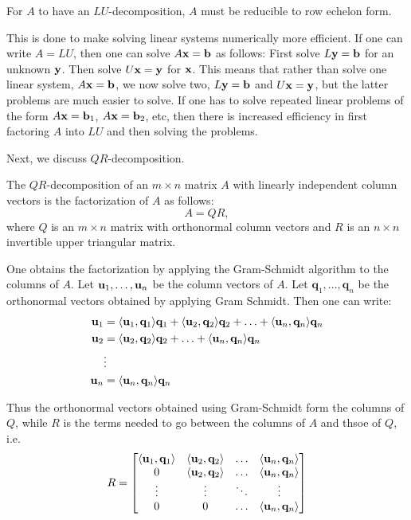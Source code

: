 \documentclass{article}
\begin{document}
For $A$ to have an $LU$-decomposition, $A$ must be reducible to row echelon form.

This is done to make solving linear systems numerically more efficient. If one can write $A = LU$, then one can solve $A {\mathbf{x}} = \mathbf{b}$ as follows:
First solve $L {\mathbf{y}} = \mathbf{b}$ for an unknown ${\mathbf{y}}$. Then solve $U {\mathbf{x}} = {\mathbf{y}}$ for ${\mathbf{x}}$. This means that rather than solve one linear system, $A {\mathbf{x}} = \mathbf{b}$, we now solve two, $L {\mathbf{y}} = \mathbf{b}$ and $U {\mathbf{x}} = {\mathbf{y}}$, but the latter problems are much easier to solve. If one has to solve repeated linear problems of the form $A{\mathbf{x}}=\mathbf{b}_1$, $A{\mathbf{x}}=\mathbf{b}_2$, etc, then there is increased efficiency in first factoring $A$ into $LU$ and then solving the problems.  

Next, we discuss $QR$-decomposition.

\begin{definition}[$QR$-decomposition]
The $QR$-decomposition of an $m \times n$ matrix $A$ with linearly independent column vectors is the factorization of $A$ as follows:
\begin{equation*}
    A = QR,
\end{equation*}
where $Q$ is an $m \times n$ matrix with orthonormal column vectors and $R$ is an $n\times n$ invertible upper triangular matrix.
\end{definition}

One obtains the factorization by applying the Gram-Schmidt algorithm to the columns of $A$. Let ${\mathbf{u}}_1, \ldots, {\mathbf{u}}_n$ be the column vectors of $A$. Let $\mathbf{q}_1, \ldots, \mathbf{q}_n$ be the orthonormal vectors obtained by applying Gram Schmidt. Then one can write:
\begin{align*}
    {\mathbf{u}}_1 &= \langle {\mathbf{u}}_1,\mathbf{q}_1 \rangle\mathbf{q}_1 + \langle {\mathbf{u}}_2,\mathbf{q}_2 \rangle\mathbf{q}_2+ \ldots +  \langle {\mathbf{u}}_n,\mathbf{q}_n \rangle \mathbf{q}_n \\
    {\mathbf{u}}_2 &= \langle {\mathbf{u}}_2,\mathbf{q}_2 \rangle\mathbf{q}_2 + \ldots +  \langle {\mathbf{u}}_n,\mathbf{q}_n \rangle \mathbf{q}_n \\
    & \vdots \\
    {\mathbf{u}}_n &=  \langle {\mathbf{u}}_n,\mathbf{q}_n \rangle \mathbf{q}_n
\end{align*}

Thus the orthonormal vectors obtained using Gram-Schmidt form the columns of $Q$, while $R$ is the terms needed to go between the columns of $A$ and thsoe of $Q$, i.e.
$$ R = \begin{bmatrix}
\langle {\mathbf{u}}_1,\mathbf{q}_1 \rangle & \langle {\mathbf{u}}_2,\mathbf{q}_2 \rangle & \ldots & \langle {\mathbf{u}}_n,\mathbf{q}_n \rangle \\
0 & \langle {\mathbf{u}}_2,\mathbf{q}_2 \rangle & \ldots & \langle {\mathbf{u}}_n,\mathbf{q}_n \rangle \\
\vdots &\vdots & \ddots & \vdots \\
0 & 0 & \ldots & \langle {\mathbf{u}}_n,\mathbf{q}_n \rangle 
\end{bmatrix}$$
\end{document}
